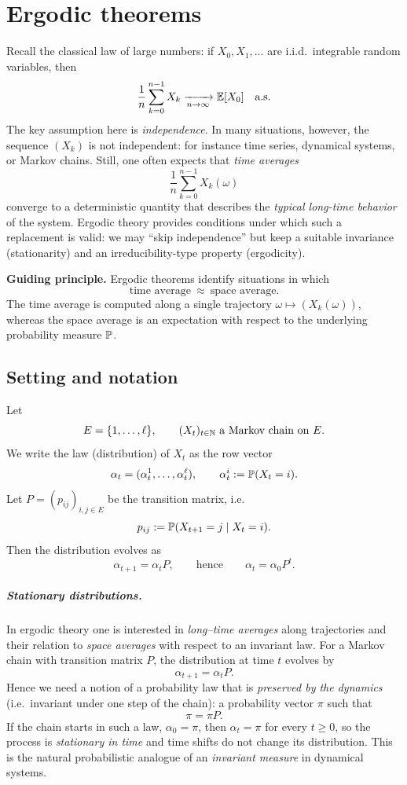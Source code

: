 \chapter{Ergodic theorems}

Recall the classical law of large numbers: if \(X_0,X_1,\dots\) are i.i.d.\ integrable random variables, then
\[
\frac1n\sum_{k=0}^{n-1}X_k \xrightarrow[n\to\infty]{} \mathbb{E}[X_0]
\quad \text{a.s.}
\]
The key assumption here is \emph{independence}. In many situations, however, the sequence \((X_k)\) is not independent:
for instance time series, dynamical systems, or Markov chains. Still, one often expects that \emph{time averages}
\[
\frac1n\sum_{k=0}^{n-1}X_k(\omega)
\]
converge to a deterministic quantity that describes the \emph{typical long-time behavior} of the system.
Ergodic theory provides conditions under which such a replacement is valid: we may ``skip independence'' but keep
a suitable invariance (stationarity) and an irreducibility-type property (ergodicity).

\medskip

\noindent
\textbf{Guiding principle.}
Ergodic theorems identify situations in which
\[
\text{time average} \ \approx\ \text{space average}.
\]
The time average is computed along a single trajectory \(\omega \mapsto (X_k(\omega))\),
whereas the space average is an expectation with respect to the underlying probability measure \(\mathbb{P}\).

\section{Setting and notation}
Let
\[
E=\{1,\dots,\ell\},
\qquad (X_t)_{t\in\mathbb{N}} \ \text{a Markov chain on } E.
\]
We write the law (distribution) of \(X_t\) as the row vector
\[
\alpha_t = (\alpha_t^1,\dots,\alpha_t^\ell),
\qquad \alpha_t^i := \mathbb{P}(X_t=i).
\]
Let \(P=(p_{ij})_{i,j\in E}\) be the transition matrix, i.e.
\[
p_{ij} := \mathbb{P}(X_{t+1}=j \mid X_t=i).
\]
Then the distribution evolves as
\[
\alpha_{t+1} = \alpha_t P,
\qquad\text{hence}\qquad
\alpha_t = \alpha_0 P^t.
\]

\paragraph{Stationary distributions.}
In ergodic theory one is interested in \emph{long--time averages} along trajectories and their relation to
\emph{space averages} with respect to an invariant law. For a Markov chain with transition matrix $P$,
the distribution at time $t$ evolves by
\[
\alpha_{t+1}=\alpha_t P.
\]
Hence we need a notion of a probability law that is \emph{preserved by the dynamics} (i.e.\ invariant under one step of the chain):
a probability vector $\pi$ such that
\[
\pi=\pi P.
\]
If the chain starts in such a law, $\alpha_0=\pi$, then $\alpha_t=\pi$ for every $t\ge 0$, so the process is
\emph{stationary in time} and time shifts do not change its distribution. This is the natural probabilistic analogue
of an \emph{invariant measure} in dynamical systems.


